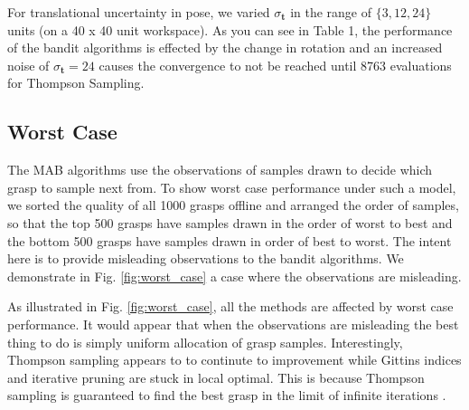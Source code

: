 \documentclass[10pt, conference]{ieeeconf}      %
\newcommand{\bt}{\mathbf{t}}
\begin{document}
For translational uncertainty in pose, we varied $\sigma_{\bt}$ in the range of $\lbrace 3,12, 24 \rbrace$ units (on a 40 x 40 unit workspace). As you can see in Table 1, the performance of the bandit algorithms is effected by the change in rotation and an increased noise of $\sigma_{\bt} = 24$ causes the convergence to not be reached until 8763 evaluations for Thompson Sampling. 



\subsection{Worst Case}
The MAB algorithms use the observations of samples drawn to decide which grasp to sample next from. To show worst case performance under such a model, we sorted the quality of all 1000 grasps offline and arranged the order of samples, so that the top 500 grasps have samples drawn in the order of worst to best and the bottom 500 grasps have samples drawn in order of best to worst. The intent here is to provide misleading observations to the bandit algorithms. We demonstrate in Fig. \ref{fig:worst_case} a case where the observations are misleading. 

As illustrated in Fig. \ref{fig:worst_case}, all the methods are affected by worst case performance. It would appear that when the observations are misleading the best thing to do is simply uniform allocation of grasp samples. Interestingly, Thompson sampling appears to to continute to improvement while Gittins indices and iterative pruning are stuck in local optimal. This is because Thompson sampling is guaranteed to find the best grasp in the limit of infinite iterations \cite{agrawal2011analysis}.
\end{document}
